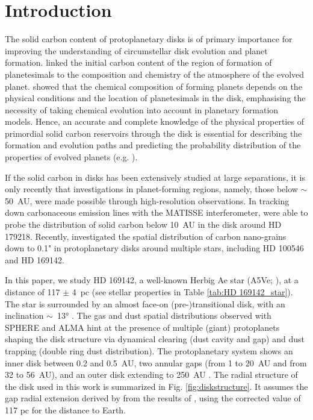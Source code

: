 \documentclass{aa}
\begin{document}
\maketitle


\section{Introduction}

The solid carbon content of protoplanetary disks is of primary importance for improving the understanding of circumstellar disk evolution and planet formation. \citet{Oberg2011} linked the initial carbon content of the region of formation of planetesimals to the composition and chemistry of the atmosphere of the evolved planet. \citet{Eistrup2018} showed that the chemical composition of forming planets depends on the physical conditions and the location of planetesimals in the disk, emphasising the necessity of taking chemical evolution into account
in planetary formation models. Hence, an accurate and complete knowledge of the physical properties of primordial solid carbon reservoirs through the disk is essential for describing the formation and evolution paths and predicting the probability distribution of the properties of evolved planets (e.g. \citet{Oberg2011}). 

If the solid carbon in disks has been extensively studied at large separations, it is only recently that investigations in planet-forming regions, namely, those below $\sim$50~AU, were made possible through high-resolution observations. In tracking down carbonaceous emission lines with the MATISSE interferometer, \citet{Kokoulina2021} were able to probe the distribution of solid carbon below 10~AU in the disk around HD 179218. Recently, \citet{Bouteraon_032019} investigated the spatial distribution of carbon nano-grains down to 0.1" in protoplanetary disks around multiple stars, including HD 100546 and HD 169142. 

In this paper, we study HD 169142, a well-known Herbig Ae star (A5Ve; \citet{Keller2008}), at a distance of 117 $\pm$ 4~pc \citep{Manoj_2006, Grady2007, GaiaCollaboration2016} (see stellar properties in Table \ref{tab:HD 169142_star}). The star is surrounded by an almost face-on (pre-)transitional disk, with an inclination $\sim$~\ang{13} \citep{Panic2008}.
The gas and dust spatial distributions observed with SPHERE and ALMA hint at the presence of multiple (giant) protoplanets shaping the disk structure via dynamical clearing (dust cavity and gap) and dust trapping (double ring dust distribution). 
The protoplanetary system shows an inner disk between 0.2 and 0.5~AU, two annular gaps (from 1 to 20~AU and from 32 to 56~AU), and an outer disk extending to 250~AU \citep{Quanz_2013, Osorio_2014, Ligi2018, Momose2015, Fedele2017, Bertrang2018, Honda2012, Perraut2019}. The radial structure of the disk used in this work is summarized in Fig. \ref{fig:diskstructure}. It assumes the gap radial extension derived by \citet{Ligi2018} from the results of \citet{Quanz_2013}, using the corrected value of 117 pc for the distance to Earth.
\end{document}
